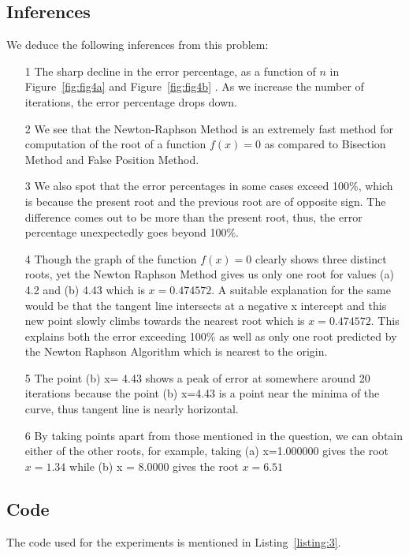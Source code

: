 \documentclass[titlepage, 11pt]{article}
\begin{document}
\subsection{Inferences}
We deduce the following inferences from this problem:
\begin{itemize}
    \item [1] The sharp decline in the error percentage, as a function of $n$ in Figure~\ref{fig:fig4a} and Figure~\ref{fig:fig4b} . As we increase the number of iterations, the error percentage drops down.
    \item [2] We see that the Newton-Raphson Method is an extremely fast method for  computation of the root of a function $f(x)=0$ as compared to Bisection Method and False Position Method.
    \item [3] We also spot that the error percentages in some cases exceed 100\%, which is because the present root and the previous root are of opposite sign. The difference comes out to be more than the present root, thus, the error percentage unexpectedly goes beyond 100\%.
    \item [4] Though the graph of the function $f(x)=0$ clearly shows three distinct roots, yet the Newton Raphson Method gives us only one root for values (a) 4.2 and (b) 4.43 which is $x=0.474572$. A suitable explanation for the same would be that the tangent line intersects at a negative x intercept and this new point slowly climbs towards the nearest root which is $x=0.474572$. This explains both the error exceeding 100\% as well as only one root predicted by the Newton Raphson Algorithm which is nearest to the origin. 
    \item [5] The point (b) x= 4.43 shows a peak of error at somewhere around 20 iterations because the point (b) x=4.43 is a point near the minima of the curve, thus tangent line is nearly horizontal. 
    \item [6] By taking points apart from those mentioned in the question, we can obtain either of the other roots, for example, taking (a) x=1.000000 gives the root $x=1.34$ while (b) x = 8.0000 gives the root $x=6.51$
\end{itemize}


\subsection{Code}
The code used for the experiments is mentioned in Listing~\ref{listing:3}. 
\end{document}
